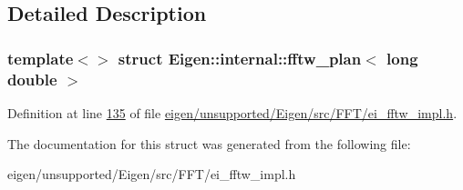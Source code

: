 \subsection{Detailed Description}
\subsubsection*{template$<$$>$\newline
struct Eigen\+::internal\+::fftw\+\_\+plan$<$ long double $>$}



Definition at line \hyperlink{eigen_2unsupported_2_eigen_2src_2_f_f_t_2ei__fftw__impl_8h_source_l00135}{135} of file \hyperlink{eigen_2unsupported_2_eigen_2src_2_f_f_t_2ei__fftw__impl_8h_source}{eigen/unsupported/\+Eigen/src/\+F\+F\+T/ei\+\_\+fftw\+\_\+impl.\+h}.



The documentation for this struct was generated from the following file\+:\begin{DoxyCompactItemize}
\item 
eigen/unsupported/\+Eigen/src/\+F\+F\+T/ei\+\_\+fftw\+\_\+impl.\+h\end{DoxyCompactItemize}
